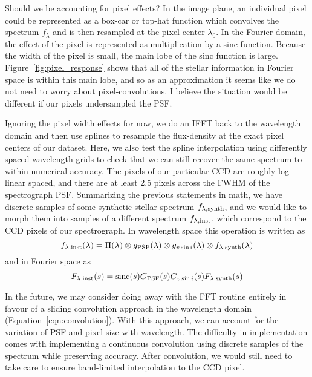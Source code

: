 \documentclass[preprint]{aastex} %
\begin{document}
Should we be accounting for pixel effects? In the image plane, an individual pixel could be represented as a box-car or top-hat function which convolves the spectrum $f_\lambda$ and is then resampled at the pixel-center $\lambda_0$. In the Fourier domain, the effect of the pixel is represented as multiplication by a sinc function. Because the width of the pixel is small, the main lobe of the sinc function is large. Figure~\ref{fig:pixel_response} shows that all of the stellar information in Fourier space is within this main lobe, and so as an approximation it seems like we do not need to worry about pixel-convolutions. I believe the situation would be different if our pixels undersampled the PSF. 

Ignoring the pixel width effects for now, we do an IFFT back to the wavelength domain and then use splines to resample the flux-density at the exact pixel centers of our dataset. Here, we also test the spline interpolation using differently spaced wavelength grids to check that we can still recover the same spectrum to within numerical accuracy. The pixels of our particular CCD are roughly log-linear spaced, and there are at least 2.5 pixels across the FWHM of the spectrograph PSF. Summarizing the previous statements in math, we have discrete samples of some synthetic stellar spectrum $f_{\lambda, {\rm synth}}$, and we would like to morph them into samples of a different spectrum $f_{\lambda, {\rm inst}}$, which correspond to the CCD pixels of our spectrograph. In wavelength space this operation is written as
\begin{equation}
  f_{\lambda, {\rm inst}}(\lambda) = \Pi(\lambda) \otimes g_{\rm PSF}(\lambda) \otimes g_{v \sin i}(\lambda) \otimes f_{\lambda, {\rm synth}}(\lambda)
  \label{eqn:convolution}
\end{equation}
and in Fourier space as
\begin{equation}
  F_{\lambda, {\rm inst}}(s) = {\rm sinc}(s) G_{\rm PSF}(s) G_{v \sin i}(s) F_{\lambda, {\rm synth}}(s)
\end{equation}


In the future, we may consider doing away with the FFT routine entirely in favour of a sliding convolution approach in the wavelength domain (Equation~\ref{eqn:convolution}). With this approach, we can account for the variation of PSF and pixel size with wavelength. The difficulty in implementation comes with implementing a continuous convolution using discrete samples of the spectrum while preserving accuracy. After convolution, we would still need to take care to ensure band-limited interpolation to the CCD pixel.
\end{document}
